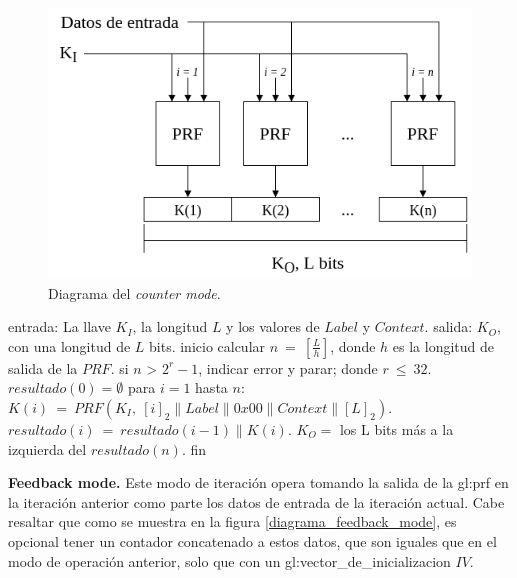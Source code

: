 \begin{figure}[H]
  \begin{center}
    \includegraphics[width=0.75\linewidth]{diagramas/counter_mode}
    \caption{Diagrama del \textit{counter mode}.}
    \label{diagrama_counter_mode}
   \end{center}
\end{figure}

\begin{pseudocodigo}[caption={Funcionamiento del \textit{counter mode}.}, 
label={mi:1}]
  entrada:   La llave $K_I$, la longitud $L$ y los valores de $Label$ y $Context$.
  salida:    $K_O$, con una longitud de $L$ bits.
  inicio
    calcular $n\: =\: [\frac{L}{h}]$, donde $h$ es la longitud de salida de la $PRF$.
    si $n$ > $2^r-1$, indicar error y parar; donde $r\: \leq\: 32$.
    $resultado(0) = \emptyset$
    para $i=1$ hasta $n$:
      $K(i)\: =\: PRF(K_I,\: {[i]}_2 \parallel Label \parallel 0x00 \parallel Context \parallel {[L]}_2 )$.
      $resultado(i)\: =\: resultado(i-1) \parallel K(i)$.
    $K_O =$ los L bits más a la izquierda del $resultado(n)$.
  fin
\end{pseudocodigo}

\textbf{Feedback mode.}
Este modo de iteración opera tomando la salida de la \gls{gl:prf} en la
iteración anterior como parte los datos de entrada de la iteración actual.
Cabe resaltar que como se muestra en la figura \ref{diagrama_feedback_mode}, 
es opcional tener un contador concatenado a estos datos, que son iguales que 
en el modo de operación anterior, solo que con un 
\gls{gl:vector_de_inicializacion} $IV$.

